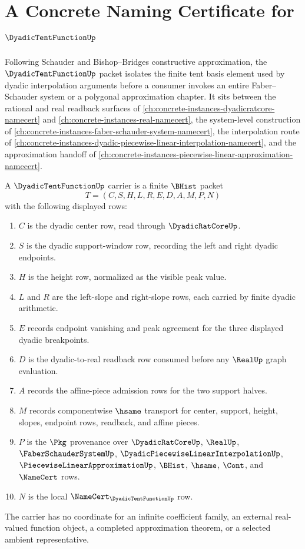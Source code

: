 \chapter{A Concrete Naming Certificate for $\DyadicTentFunctionUp$}
\label{ch:concrete-instances-dyadic-tent-function-namecert}

Following Schauder and Bishop--Bridges constructive approximation, the $\DyadicTentFunctionUp$ packet isolates the finite tent basis element used by dyadic interpolation arguments before a consumer invokes an entire Faber--Schauder system or a polygonal approximation chapter. It sits between the rational and real readback surfaces of \autoref{ch:concrete-instances-dyadicratcore-namecert} and \autoref{ch:concrete-instances-real-namecert}, the system-level construction of \autoref{ch:concrete-instances-faber-schauder-system-namecert}, the interpolation route of \autoref{ch:concrete-instances-dyadic-piecewise-linear-interpolation-namecert}, and the approximation handoff of \autoref{ch:concrete-instances-piecewise-linear-approximation-namecert}.

\begin{definition}
\label{def:dyadic-tent-function-carrier}
A $\DyadicTentFunctionUp$ carrier is a finite $\BHist$ packet
$$
T=(C,S,H,L,R,E,D,A,M,P,N)
$$
with the following displayed rows:
\begin{enumerate}
\item $C$ is the dyadic center row, read through $\DyadicRatCoreUp$.
\item $S$ is the dyadic support-window row, recording the left and right dyadic endpoints.
\item $H$ is the height row, normalized as the visible peak value.
\item $L$ and $R$ are the left-slope and right-slope rows, each carried by finite dyadic arithmetic.
\item $E$ records endpoint vanishing and peak agreement for the three displayed dyadic breakpoints.
\item $D$ is the dyadic-to-real readback row consumed before any $\RealUp$ graph evaluation.
\item $A$ records the affine-piece admission rows for the two support halves.
\item $M$ records componentwise $\hsame$ transport for center, support, height, slopes, endpoint rows, readback, and affine pieces.
\item $P$ is the $\Pkg$ provenance over $\DyadicRatCoreUp$, $\RealUp$, $\FaberSchauderSystemUp$, $\DyadicPiecewiseLinearInterpolationUp$, $\PiecewiseLinearApproximationUp$, $\BHist$, $\hsame$, $\Cont$, and $\NameCert$ rows.
\item $N$ is the local $\NameCert_{\DyadicTentFunctionUp}$ row.
\end{enumerate}
The carrier has no coordinate for an infinite coefficient family, an external real-valued function object, a completed approximation theorem, or a selected ambient representative.
\end{definition}


